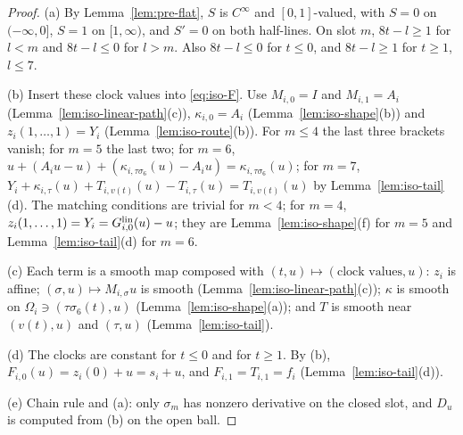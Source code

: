 \begin{proof}
(a) By Lemma~\ref{lem:pre-flat}, $S$ is $C^\infty$ and $[0,1]$-valued, with $S=0$ on $(-\infty,0]$, $S=1$ on $[1,\infty)$, and $S'=0$ on both half-lines. On slot $m$, $8t-l\ge1$ for $l<m$ and $8t-l\le0$ for $l>m$. Also $8t-l\le0$ for $t\le0$, and $8t-l\ge1$ for $t\ge1$, $l\le7$.

(b) Insert these clock values into \eqref{eq:iso-F}. Use $M_{i,0}=I$ and $M_{i,1}=A_i$ (Lemma~\ref{lem:iso-linear-path}(c)), $\kappa_{i,0}=A_i$ (Lemma~\ref{lem:iso-shape}(b)) and $z_i(1,\dots,1)=Y_i$ (Lemma~\ref{lem:iso-route}(b)).
For $m\le4$ the last three brackets vanish; for $m=5$ the last two; for $m=6$, $u+(A_iu-u)+(\kappa_{i,\tau\sigma_6}(u)-A_iu)=\kappa_{i,\tau\sigma_6}(u)$; for $m=7$, $Y_i+\kappa_{i,\tau}(u)+T_{i,v(t)}(u)-T_{i,\tau}(u)=T_{i,v(t)}(u)$ by Lemma~\ref{lem:iso-tail}(d). The matching conditions are trivial for $m<4$; for $m=4$, $z_i(1,\dots,1)=Y_i=G^{\rm lin}_{i,0}(u)-u$; they are Lemma~\ref{lem:iso-shape}(f) for $m=5$ and Lemma~\ref{lem:iso-tail}(d) for $m=6$.

(c) Each term is a smooth map composed with $(t,u)\mapsto(\text{clock values},u)$: $z_i$ is affine; $(\sigma,u)\mapsto M_{i,\sigma}u$ is smooth (Lemma~\ref{lem:iso-linear-path}(c)); $\kappa$ is smooth on $\Omega_i\ni(\tau\sigma_6(t),u)$ (Lemma~\ref{lem:iso-shape}(a)); and $T$ is smooth near $(v(t),u)$ and $(\tau,u)$ (Lemma~\ref{lem:iso-tail}).

(d) The clocks are constant for $t\le0$ and for $t\ge1$. By (b), $F_{i,0}(u)=z_i(0)+u=s_i+u$, and $F_{i,1}=T_{i,1}=f_i$ (Lemma~\ref{lem:iso-tail}(d)).

(e) Chain rule and (a): only $\sigma_m$ has nonzero derivative on the closed slot, and $D_u$ is computed from (b) on the open ball.
\end{proof}

